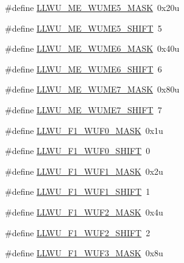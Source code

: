 \begin{DoxyCompactItemize}
\item 
\#define \hyperlink{group___l_l_w_u___register___masks_gadeab309cd88e84e94433398ea4656511}{L\+L\+W\+U\+\_\+\+M\+E\+\_\+\+W\+U\+M\+E5\+\_\+\+M\+A\+SK}~0x20u
\item 
\#define \hyperlink{group___l_l_w_u___register___masks_ga8eb531aa288bc7d32d75950b7bf9b1a5}{L\+L\+W\+U\+\_\+\+M\+E\+\_\+\+W\+U\+M\+E5\+\_\+\+S\+H\+I\+FT}~5
\item 
\#define \hyperlink{group___l_l_w_u___register___masks_ga4f4902c05f5e93174a1ef5afaa426d01}{L\+L\+W\+U\+\_\+\+M\+E\+\_\+\+W\+U\+M\+E6\+\_\+\+M\+A\+SK}~0x40u
\item 
\#define \hyperlink{group___l_l_w_u___register___masks_gaba71957dbca47b2dd3aaec44106b013e}{L\+L\+W\+U\+\_\+\+M\+E\+\_\+\+W\+U\+M\+E6\+\_\+\+S\+H\+I\+FT}~6
\item 
\#define \hyperlink{group___l_l_w_u___register___masks_ga455f995ef197eea9796910ff1b7327a0}{L\+L\+W\+U\+\_\+\+M\+E\+\_\+\+W\+U\+M\+E7\+\_\+\+M\+A\+SK}~0x80u
\item 
\#define \hyperlink{group___l_l_w_u___register___masks_ga1676e95c4d2477005c4c37ee97b45db3}{L\+L\+W\+U\+\_\+\+M\+E\+\_\+\+W\+U\+M\+E7\+\_\+\+S\+H\+I\+FT}~7
\item 
\#define \hyperlink{group___l_l_w_u___register___masks_ga1308a2e0d967a81b7fc32af6816cb532}{L\+L\+W\+U\+\_\+\+F1\+\_\+\+W\+U\+F0\+\_\+\+M\+A\+SK}~0x1u
\item 
\#define \hyperlink{group___l_l_w_u___register___masks_ga6a004e1e5a54356cf5b70d9f17b96afc}{L\+L\+W\+U\+\_\+\+F1\+\_\+\+W\+U\+F0\+\_\+\+S\+H\+I\+FT}~0
\item 
\#define \hyperlink{group___l_l_w_u___register___masks_ga3513d59cf672e1dfd8884672b57c879b}{L\+L\+W\+U\+\_\+\+F1\+\_\+\+W\+U\+F1\+\_\+\+M\+A\+SK}~0x2u
\item 
\#define \hyperlink{group___l_l_w_u___register___masks_gadfac3bafc6a624b27f059e3d9cf3a899}{L\+L\+W\+U\+\_\+\+F1\+\_\+\+W\+U\+F1\+\_\+\+S\+H\+I\+FT}~1
\item 
\#define \hyperlink{group___l_l_w_u___register___masks_gabc46629018d0f2eb7a39896eb5225933}{L\+L\+W\+U\+\_\+\+F1\+\_\+\+W\+U\+F2\+\_\+\+M\+A\+SK}~0x4u
\item 
\#define \hyperlink{group___l_l_w_u___register___masks_gab99e1778fd26ccd69f31a56d94709e41}{L\+L\+W\+U\+\_\+\+F1\+\_\+\+W\+U\+F2\+\_\+\+S\+H\+I\+FT}~2
\item 
\#define \hyperlink{group___l_l_w_u___register___masks_ga7c81d1a3309d56f967355042ac08c299}{L\+L\+W\+U\+\_\+\+F1\+\_\+\+W\+U\+F3\+\_\+\+M\+A\+SK}~0x8u
\item 

\end{DoxyCompactItemize}
